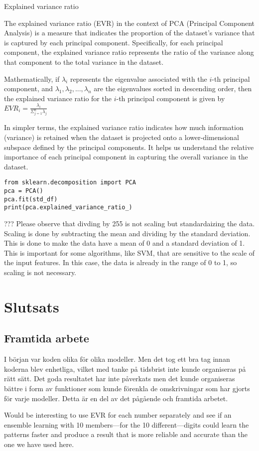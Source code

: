 \documentclass[12pt,a4paper]{article}
\begin{document}
Explained variance ratio \citep{Izenman,Kuhn,open}

The explained variance ratio (EVR) in the context of PCA (Principal Component Analysis) is a measure that indicates the proportion of the dataset's variance that is captured by each principal component. Specifically, for each principal component, the explained variance ratio represents the ratio of the variance along that component to the total variance in the dataset.

Mathematically, if $\lambda_i$ represents the eigenvalue associated with the $i$-th principal component, and $\lambda_1, \lambda_2, ..., \lambda_n$ are the eigenvalues sorted in descending order, then the explained variance ratio for the $i$-th principal component is given by
$EV R_i = \frac{\lambda_i}{\Sigma_{j=1}^{n}\lambda_j}$

In simpler terms, the explained variance ratio indicates how much information (variance) is retained when the dataset is projected onto a lower-dimensional subspace defined by the principal components. It helps us understand the relative importance of each principal component in capturing the overall variance in the dataset.


\begin{verbatim}
from sklearn.decomposition import PCA
pca = PCA()
pca.fit(std_df)
print(pca.explained_variance_ratio_)
\end{verbatim}


??? Please observe that divding by 255 is not scaling but standardaizing the data. Scaling is done by subtracting the mean and dividing by the standard deviation. This is done to make the data have a mean of 0 and a standard deviation of 1. This is important for some algorithms, like SVM, that are sensitive to the scale of the input features. In this case, the data is already in the range of 0 to 1, so scaling is not necessary.





\section{Slutsats}
\subsection{Framtida arbete}

I början var koden olika för olika modeller. Men det tog ett bra tag innan koderna blev enhetliga, vilket med tanke på tidsbrist inte kunde organiseras på rätt sätt. Det goda resultatet har inte påverkats men det kunde organiseras bättre i form av funktioner som kunde förenkla de omskrivningar som har gjorts för varje modeller. Detta är en del av det pågående och framtida arbetet.

Would be interesting to use EVR for each number separately and see if an ensemble learning with 10 members---for the 10 different---digits could learn the patterns faster and produce a result that is more reliable and accurate than the one we have used here.



\end{document}
